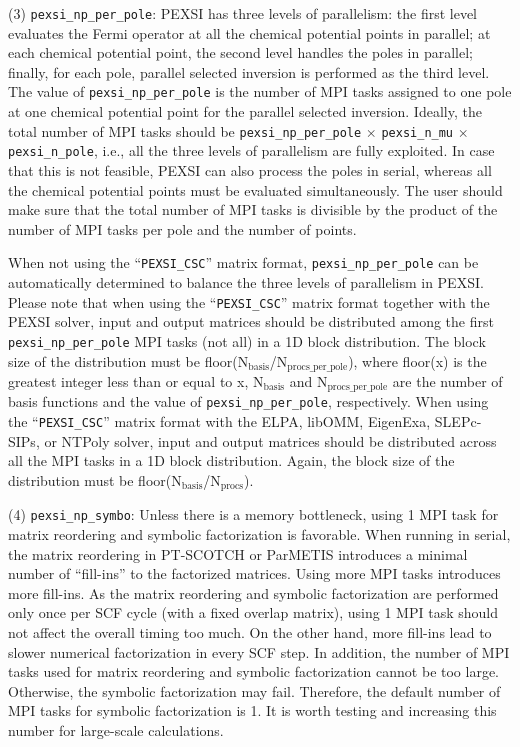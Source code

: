 \documentclass{report}
\begin{document}
(3) \texttt{pexsi\_np\_per\_pole}: PEXSI has three levels of parallelism: the first level evaluates the Fermi operator at all the chemical potential points in parallel; at each chemical potential point, the second level handles the poles in parallel; finally, for each pole, parallel selected inversion is performed as the third level. The value of \texttt{pexsi\_np\_per\_pole} is the number of MPI tasks assigned to one pole at one chemical potential point for the parallel selected inversion. Ideally, the total number of MPI tasks should be \texttt{pexsi\_np\_per\_pole} $\times$ \texttt{pexsi\_n\_mu} $\times$ \texttt{pexsi\_n\_pole}, i.e., all the three levels of parallelism are fully exploited. In case that this is not feasible, PEXSI can also process the poles in serial, whereas all the chemical potential points must be evaluated simultaneously. The user should make sure that the total number of MPI tasks is divisible by the product of the number of MPI tasks per pole and the number of points.

When not using the ``\texttt{PEXSI\_CSC}'' matrix format, \texttt{pexsi\_np\_per\_pole} can be automatically determined to balance the three levels of parallelism in PEXSI. Please note that when using the ``\texttt{PEXSI\_CSC}'' matrix format together with the PEXSI solver, input and output matrices should be distributed among the first \texttt{pexsi\_np\_per\_pole} MPI tasks (not all) in a 1D block distribution. The block size of the distribution must be floor($\text{N}_\text{basis}$/$\text{N}_\text{procs\_per\_pole}$), where floor(x) is the greatest integer less than or equal to x, $\text{N}_\text{basis}$ and $\text{N}_\text{procs\_per\_pole}$ are the number of basis functions and the value of \texttt{pexsi\_np\_per\_pole}, respectively. When using the ``\texttt{PEXSI\_CSC}'' matrix format with the ELPA, libOMM, EigenExa, SLEPc-SIPs, or NTPoly solver, input and output matrices should be distributed across all the MPI tasks in a 1D block distribution. Again, the block size of the distribution must be floor($\text{N}_\text{basis}$/$\text{N}_\text{procs}$).

(4) \texttt{pexsi\_np\_symbo}: Unless there is a memory bottleneck, using 1 MPI task for matrix reordering and symbolic factorization is favorable. When running in serial, the matrix reordering in PT-SCOTCH or ParMETIS introduces a minimal number of ``fill-ins'' to the factorized matrices. Using more MPI tasks introduces more fill-ins. As the matrix reordering and symbolic factorization are performed only once per SCF cycle (with a fixed overlap matrix), using 1 MPI task should not affect the overall timing too much. On the other hand, more fill-ins lead to slower numerical factorization in every SCF step. In addition, the number of MPI tasks used for matrix reordering and symbolic factorization cannot be too large. Otherwise, the symbolic factorization may fail. Therefore, the default number of MPI tasks for symbolic factorization is 1. It is worth testing and increasing this number for large-scale calculations.
\end{document}
